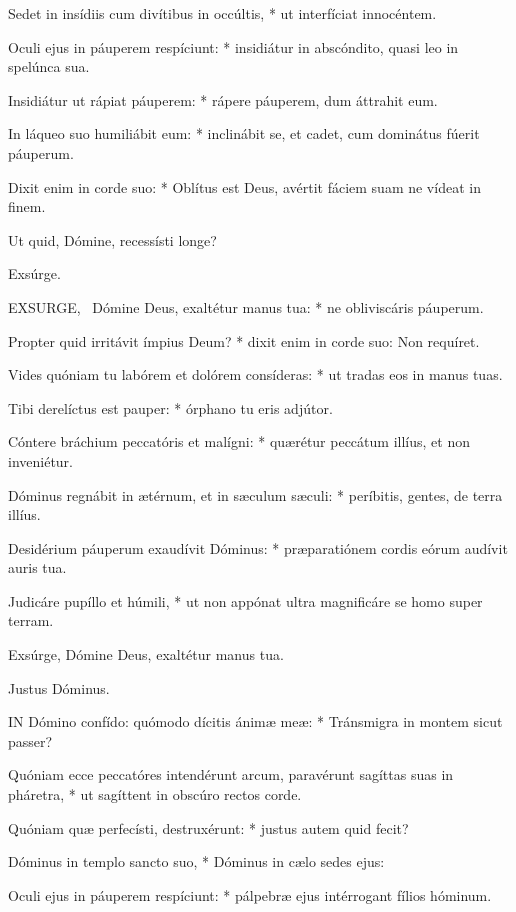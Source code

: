Sedet in insídiis cum divítibus in occúltis, * ut interfíciat innocéntem.

Oculi ejus in páuperem respíciunt: * insidiátur in abscóndito, quasi leo in spelúnca sua.

Insidiátur ut rápiat páuperem: * rápere páuperem, dum áttrahit eum.

In láqueo suo humiliábit eum: * inclinábit se, et cadet, cum dominátus fúerit páuperum.

Dixit enim in corde suo: * Oblítus est Deus, avértit fáciem suam ne vídeat in finem.

 Ut quid, Dómine, recessísti longe?

 Exsúrge. \textdagger


\lettrine[lines=2]{E}{XSURGE}, \textdagger\ Dómine Deus, exaltétur manus tua: * ne obliviscáris páuperum.

Propter quid irritávit ímpius Deum? * dixit enim in corde suo: Non requíret.

Vides quóniam tu labórem et dolórem consíderas: * ut tradas eos in manus tuas.

Tibi derelíctus est pauper: * órphano tu eris adjútor.

Cóntere bráchium peccatóris et malígni: * quærétur peccátum illíus, et non inveniétur.

Dóminus regnábit in ætérnum, et in sæculum sæculi: * períbitis, gentes, de terra illíus.

Desidérium páuperum exaudívit Dóminus: * præparatiónem cordis eórum audívit auris tua.

Judicáre pupíllo et húmili, * ut non appónat ultra magnificáre se homo super terram.

 Exsúrge, Dómine Deus, exaltétur manus tua.

 Justus Dóminus.


\lettrine[lines=2]{I}{N} Dómino confído: quómodo dícitis ánimæ meæ: * Tránsmigra in montem sicut passer?

Quóniam ecce peccatóres intendérunt arcum, paravérunt sagíttas suas in pháretra, * ut sagíttent in obscúro rectos corde.

Quóniam quæ perfecísti, destruxérunt: * justus autem quid fecit?

Dóminus in templo sancto suo, * Dóminus in cælo sedes ejus:

Oculi ejus in páuperem respíciunt: * pálpebræ ejus intérrogant fílios hóminum.

